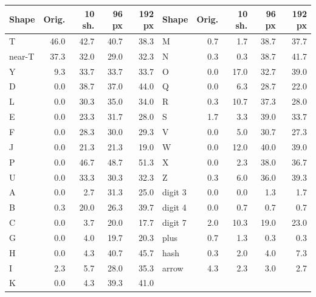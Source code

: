 
\begin{tabular}{lrrrr@{\hspace{1.5em}}lrrrr}
\toprule
Shape & Orig. & 10 sh. & 96 px & 192 px & Shape & Orig. & 10 sh. & 96 px & 192 px \\
\midrule
T & 46.0 & 42.7 & 40.7 & 38.3 & M & 0.7 & 1.7 & 38.7 & 37.7 \\
near-T & 37.3 & 32.0 & 29.0 & 32.3 & N & 0.3 & 0.3 & 38.7 & 41.7 \\
Y & 9.3 & 33.7 & 33.7 & 33.7 & O & 0.0 & 17.0 & 32.7 & 39.0 \\
D & 0.0 & 38.7 & 37.0 & 44.0 & Q & 0.0 & 6.3 & 28.7 & 22.0 \\
L & 0.0 & 30.3 & 35.0 & 34.0 & R & 0.3 & 10.7 & 37.3 & 28.0 \\
E & 0.0 & 23.3 & 31.7 & 28.0 & S & 1.7 & 3.3 & 39.0 & 33.7 \\
F & 0.0 & 28.3 & 30.0 & 29.3 & V & 0.0 & 5.0 & 30.7 & 27.3 \\
J & 0.0 & 21.3 & 21.3 & 19.0 & W & 0.0 & 12.0 & 40.0 & 39.0 \\
P & 0.0 & 46.7 & 48.7 & 51.3 & X & 0.0 & 2.3 & 38.0 & 36.7 \\
U & 0.0 & 33.3 & 30.3 & 32.3 & Z & 0.3 & 6.0 & 36.0 & 39.3 \\
A & 0.0 & 2.7 & 31.3 & 25.0 & digit 3 & 0.0 & 0.0 & 1.3 & 1.7 \\
B & 0.3 & 20.0 & 26.3 & 39.7 & digit 4 & 0.0 & 0.7 & 0.7 & 0.7 \\
C & 0.0 & 3.7 & 20.0 & 17.7 & digit 7 & 2.0 & 10.3 & 19.0 & 23.0 \\
G & 0.0 & 4.0 & 19.7 & 20.3 & plus & 0.7 & 1.3 & 0.3 & 0.3 \\
H & 0.0 & 4.3 & 40.7 & 45.7 & hash & 0.3 & 2.0 & 4.0 & 7.3 \\
I & 2.3 & 5.7 & 28.0 & 35.3 & arrow & 4.3 & 2.3 & 3.0 & 2.7 \\
K & 0.0 & 4.3 & 39.3 & 41.0 &  & & & &  \\
\bottomrule
\end{tabular}
